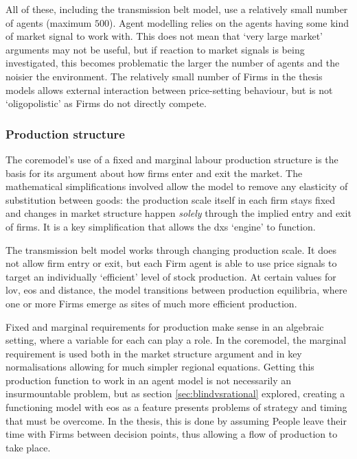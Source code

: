 All of these, including the transmission belt model, use a relatively small number of agents (maximum $500$). Agent modelling relies on the agents having some kind of market signal to work with. This does not mean that `very large market' arguments may not be useful, but if reaction to market signals is being investigated, this becomes problematic the larger the number of agents and the noisier the environment. The relatively small number of Firms in the thesis models allows external interaction between price-setting behaviour, but is not `oligopolistic' as Firms do not directly compete.


\subsubsection{Production structure}

The \gls{coremodel}'s use of a fixed and marginal labour production structure is the basis for its argument about how firms enter and exit the market. The mathematical simplifications involved allow the model to remove any elasticity of substitution between goods: the production scale itself in each firm stays fixed and changes in market structure happen \emph{solely} through the implied entry and exit of firms. It is a key simplification that allows the \gls{dxs} `engine' to function.

The transmission belt model works through changing production scale. It does not allow firm entry or exit, but each Firm agent is able to use price signals to target an individually `efficient' level of stock production. At certain values for \gls{lov}, \gls{eos} and distance, the model transitions between production equilibria, where one or more Firms emerge as sites of much more efficient production.

Fixed and marginal requirements for production make sense in an algebraic setting, where a variable for each can play a role. In the \gls{coremodel}, the marginal requirement is used both in the market structure argument and in key normalisations allowing for much simpler regional equations. Getting this production function to work in an agent model is not necessarily an insurmountable problem, but as section \ref{sec:blindvsrational} explored, creating a functioning model with \gls{eos} as a feature presents problems of strategy and timing that must be overcome. In the thesis, this is done by assuming People leave their time with Firms between decision points, thus allowing a flow of production to take place. 


